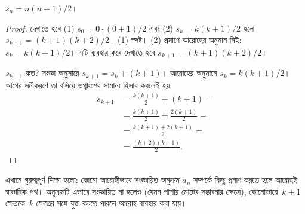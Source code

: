\documentclass[../../../include/open-logic-section]{subfiles}
\begin{document}
\begin{prop}
  $s_n = n(n+1)/2$।
\end{prop}

\begin{proof}
  দেখাতে হবে (1) $s_0 = 0\cdot(0 + 1)/2$ এবং (2) $s_k =
  k(k+1)/2$ হলে $s_{k+1} = (k+1)(k+2)/2$। (1) স্পষ্ট।
  (2) প্রমাণে আরোহের অনুমান নিই: $s_k = k(k+1)/2$।
  এটি ব্যবহার করে দেখাতে হবে $s_{k+1} = (k+1)(k+2)/2$।

  $s_{k+1}$ কত? সংজ্ঞা অনুসারে $s_{k+1} = s_k + (k+1)$।
  আরোহের অনুমানে $s_k = k(k+1)/2$। আগের সমীকরণে তা
  বসিয়ে ভগ্নাংশের সামান্য হিসাব করলেই হয়:
  \begin{align*}
    s_{k+1} & = \frac{k(k+1)}{2} + (k+1) = {}\\
    & = \frac{k(k+1)}{2} + \frac{2(k+1)}{2} = {}\\
    & = \frac{k(k+1) + 2(k+1)}{2} = {}\\
    & = \frac{(k+2)(k+1)}{2}.
  \end{align*}
\end{proof}

এখানে গুরুত্বপূর্ণ শিক্ষা হলো: কোনো আরোহীভাবে সংজ্ঞায়িত
অনুক্রম $a_n$ সম্পর্কে কিছু প্রমাণ করতে হলে আরোহই
স্বাভাবিক পথ। অনুক্রমটি এভাবে সংজ্ঞায়িত না হলেও
(যেমন পাশার মোটের সম্ভাবনার ক্ষেত্রে), কোনোভাবে~$k+1$
ক্ষেত্রকে~$k$ ক্ষেত্রের সঙ্গে যুক্ত করতে পারলে আরোহ
ব্যবহার করা যায়।
\end{document}
